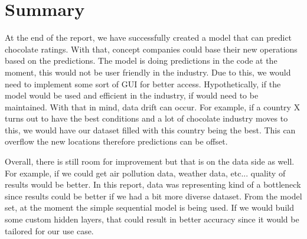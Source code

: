 \section{Summary}
At the end of the report, we have successfully created a model that can predict chocolate ratings. With that, concept companies could base their new operations based on the predictions. 
The model is doing predictions in the code at the moment, this would not be user friendly in the industry. Due to this, we would need to implement some sort of GUI for better access.
Hypothetically, if the model would be used and efficient in the industry, if would need to be maintained. With that in mind, data drift can occur. For example, if a country X turns out to have the best conditions and a lot of chocolate industry moves to this, we would have our dataset filled with this country being the best. This can overflow the new locations therefore predictions can be offset.

Overall, there is still room for improvement but that is on the data side as well. For example, if we could get air pollution data, weather data, etc... quality of results would be better. In this report, data was representing kind of a bottleneck since results could be better if we had a bit more diverse dataset. From the model set, at the moment the simple sequential model is being used. If we would build some custom hidden layers, that could result in better accuracy since it would be tailored for our use case.
